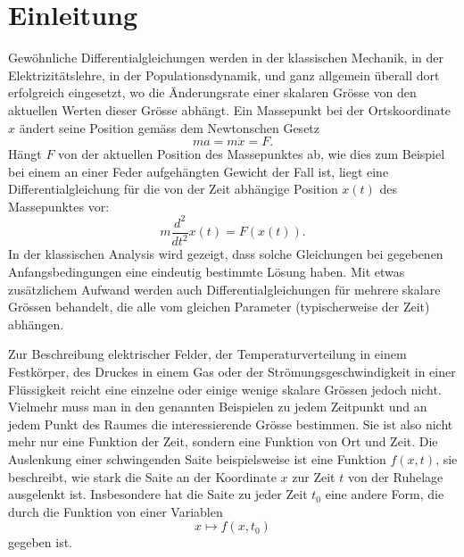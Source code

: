 %
%
%
\chapter*{Einleitung}
Gewöhnliche Differentialgleichungen werden in der klassischen Mechanik,
in der Elektrizitätslehre, in der Populationsdynamik, und ganz 
allgemein überall dort erfolgreich eingesetzt, wo die
Änderungsrate einer skalaren Grösse von den aktuellen Werten dieser Grösse
abhängt.
Ein Massepunkt bei der Ortskoordinate $x$ ändert seine Position
gemäss dem Newtonschen Gesetz
\[
ma=m\ddot x=F.
\]
Hängt $F$ von der aktuellen Position des Massepunktes ab, wie dies zum
Beispiel bei einem an einer Feder aufgehängten Gewicht der Fall ist,
liegt eine Differentialgleichung für die von der Zeit abhängige
Position $x(t)$ des Massepunktes vor:
\[
m\frac{d^2}{dt^2}x(t)=F(x(t)).
\]
In der klassischen Analysis wird gezeigt, dass solche Gleichungen bei
gegebenen Anfangsbedingungen eine eindeutig bestimmte Lösung haben.
Mit etwas zusätzlichem Aufwand werden auch Differentialgleichungen
für mehrere skalare Grössen behandelt, die alle vom gleichen Parameter
(typischerweise der Zeit) abhängen.

Zur Beschreibung elektrischer Felder, der Temperaturverteilung in
einem Fest\-körper, des Druckes in einem Gas oder der Strömungsgeschwindigkeit
in einer Flüssigkeit reicht eine einzelne oder einige wenige skalare
Grössen jedoch nicht. Vielmehr muss man in den genannten Beispielen
zu jedem Zeitpunkt und an jedem Punkt des Raumes die interessierende Grösse
bestimmen. Sie ist also nicht mehr nur eine Funktion der Zeit, sondern eine
Funktion von Ort und Zeit.
Die Auslenkung einer schwingenden Saite
beispielsweise ist eine Funktion $f(x,t)$, sie beschreibt, wie stark
die Saite an der Koordinate $x$ zur Zeit $t$ von der Ruhelage ausgelenkt ist.
Insbesondere hat die Saite zu jeder Zeit $t_0$ eine andere Form, die durch
die Funktion von einer Variablen
\[
x\mapsto f(x,t_0)
\]
gegeben ist.

